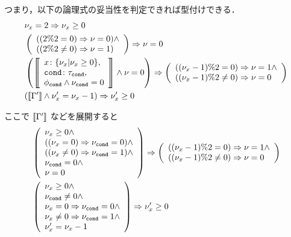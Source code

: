 \par つまり，以下の論理式の妥当性を判定できれば型付けできる．
\begin{align*}
  & \nu_x = 2 \Rightarrow \nu_x \geq 0 \\
  & \left\paren{\begin{array}{l}
    \paren{\paren{2 \% 2 = 0} \Rightarrow \nu = 0} \land \\
    \paren{\paren{2 \% 2 \neq 0} \Rightarrow \nu = 1}
  \end{array}\right} \Rightarrow \nu = 0 \\
  & \left\paren{\left\sem{\begin{array}{l}
    \typed{x}{\TyInt{\nu_x}{\nu_x \geq 0}}, \\
    \typed{\code{cond}}{\tau_\code{cond}}, \\
    \phi_\code{cond} \land \nu_\code{cond} = 0
  \end{array}\right} \land \nu = 0 \right} \Rightarrow \left\paren{\begin{array}{l}
    \paren{\paren{\nu_x - 1} \% 2 = 0} \Rightarrow \nu = 1 \land \\
    \paren{\paren{\nu_x - 1} \% 2 \neq 0} \Rightarrow \nu = 0
  \end{array}\right} \\
  & \paren{\sem{\Gamma'} \land \nu_x' = \nu_x - 1} \Rightarrow \nu_x' \geq 0
\end{align*}

\par ここで $\llbracket \Gamma' \rrbracket$ などを展開すると
\begin{align*}
  & \left\paren{\begin{array}{l}
    \nu_x \geq 0 \land \\
    \paren{\paren{\nu_x = 0} \Rightarrow \nu_\code{cond} = 0} \land \\
    \paren{\paren{\nu_x \neq 0} \Rightarrow \nu_\code{cond} = 1} \land \\
    \nu_\code{cond} = 0 \land \\
    \nu = 0
  \end{array}\right} \Rightarrow \left\paren{\begin{array}{l}
    \paren{\paren{\nu_x - 1} \% 2 = 0} \Rightarrow \nu = 1 \land \\
    \paren{\paren{\nu_x - 1} \% 2 \neq 0} \Rightarrow \nu = 0
  \end{array}\right} \\
  & \left\paren{\begin{array}{l}
    \nu_x \geq 0 \land \\
    \nu_\code{cond} \neq 0 \land \\
    \nu_x = 0 \Rightarrow \nu_\code{cond} = 0 \land \\
    \nu_x \neq 0 \Rightarrow \nu_\code{cond} = 1 \land \\
    \nu_x' = \nu_x - 1
  \end{array}\right} \Rightarrow \nu_x' \geq 0
\end{align*}
